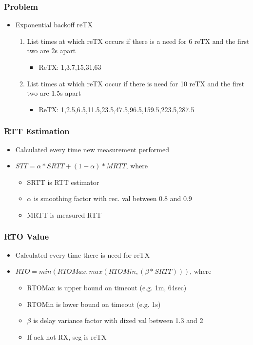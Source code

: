 \subsubsection{Problem}
\begin{itemize}
	\item Exponential backoff reTX
	\begin{enumerate}
		\item List times at which reTX occurs if there is a need for 6
			reTX and the first two are 2s apart
		\begin{itemize}
			\item ReTX: 1,3,7,15,31,63
		\end{itemize}
		\item List times at which reTX occur if there is need for 10
			reTX and the first two are 1.5s apart
		\begin{itemize}
			\item ReTX:
				1,2.5,6.5,11.5,23.5,47.5,96.5,159.5,223.5,287.5
		\end{itemize}
	\end{enumerate}
\end{itemize}
\subsubsection{RTT Estimation}
\begin{itemize}
	\item Calculated every time new measurement performed
	\item $STT = \alpha * SRTT+(1-\alpha)*MRTT$, where
	\begin{itemize}
		\item SRTT is RTT estimator
		\item $\alpha$ is smoothing factor with rec. val between 0.8 and
			0.9
		\item MRTT is measured RTT
	\end{itemize}
\end{itemize}
\subsubsection{RTO Value}
\begin{itemize}
	\item Calculated every time there is need for reTX
	\item $RTO = min (RTOMax, max(RTOMin,(\beta * SRTT)))$, where
	 \begin{itemize}
		\item RTOMax is upper bound on timeout (e.g. 1m, 64sec)
		\item RTOMin is lower bound on timeout (e.g. 1s)
		\item $\beta$ is delay variance factor with dixed val between
			1.3 and 2
		\item If ack not RX, seg is reTX
	\end{itemize}
\end{itemize}
